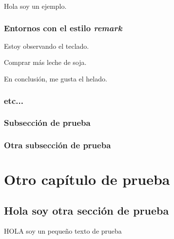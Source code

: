\begin{example}
Hola soy un ejemplo.
\end{example}

\subsection{Entornos con el estilo \textit{remark}}

\begin{remark}[Observación]
Estoy observando el teclado.
\end{remark}

\begin{note}
Comprar más leche de soja.
\end{note}
\begin{conclusion}
En conclusión, me gusta el helado.
\end{conclusion}


\subsection{etc...}
\rc{\lipsum[4-7]}



\subsection{Subsección de prueba}
\rc{\lipsum[8]}
\subsection{Otra subsección de prueba}
\rc{\lipsum[9-20]}
\chapter{Otro capítulo de prueba}
\rc{\lipsum[10]}
\section{Hola soy otra sección de prueba}
\rc{\lipsum[11-40]}

HOLA soy un pequeño texto de prueba